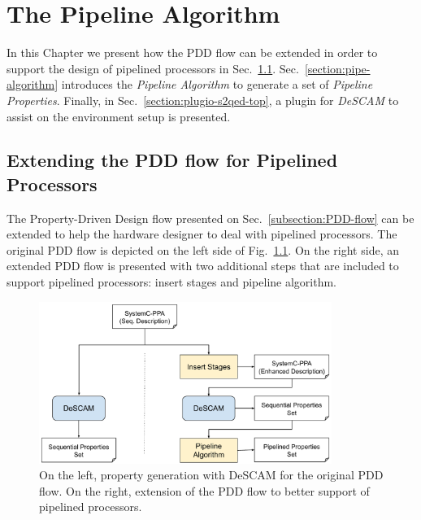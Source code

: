 \chapter{The Pipeline Algorithm}
\label{chapter:algorithm}

In this Chapter we present how the PDD flow can be extended in order to support the design of pipelined processors in Sec.~\ref{section:extend-pdd}. Sec.~\ref{section:pipe-algorithm} introduces the \textit{Pipeline Algorithm} to generate a set of \textit{Pipeline Properties}. Finally, in Sec.~\ref{section:plugio-s2qed-top}, a plugin for \textit{DeSCAM} to assist on the \SSQED{} environment setup is presented. 

\section{Extending the PDD flow for Pipelined Processors}
\label{section:extend-pdd}

The Property-Driven Design flow presented on Sec.~\ref{subsection:PDD-flow} can be extended to help the hardware designer to deal with pipelined processors. The original PDD flow is depicted on the left side of Fig.~\ref{fig:new-pdd-flow}. On the right side, an extended PDD flow is presented with two additional steps that are included to support pipelined processors: insert stages and pipeline algorithm. 

\begin{figure}[htb!]
	\centering
	\includegraphics[width=0.85\textwidth]{images/new_pdd_flow.pdf}
	\caption{On the left, property generation with DeSCAM for the original PDD flow. On the right, extension of the PDD flow to better support of pipelined processors.}
	\label{fig:new-pdd-flow}
\end{figure}

